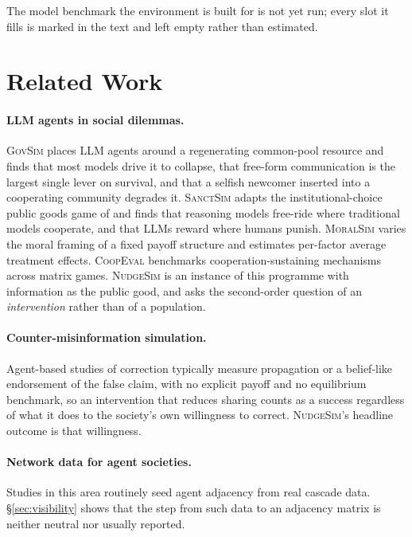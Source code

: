 \documentclass{article}
\begin{document}
The model benchmark the environment is built for is not yet run; every slot it
fills is marked in the text and left empty rather than estimated.

\section{Related Work}

\paragraph{LLM agents in social dilemmas.}
\textsc{GovSim} \citep{piatti2024govsim} places LLM agents around a regenerating
common-pool resource and finds that most models drive it to collapse, that
free-form communication is the largest single lever on survival, and that a
selfish newcomer inserted into a cooperating community degrades it.
\textsc{SanctSim} \citep{piedrahita2025sanctsim} adapts the institutional-choice
public goods game of \citet{guerek2006} and finds that reasoning models
free-ride where traditional models cooperate, and that LLMs reward where humans
punish. \textsc{MoralSim} \citep{backmann2025moralsim} varies the moral framing
of a fixed payoff structure and estimates per-factor average treatment effects.
\textsc{CoopEval} \citep{tewolde2026coopeval} benchmarks cooperation-sustaining
mechanisms across matrix games. \textsc{NudgeSim} is an instance of this
programme with information as the public good, and asks the second-order
question of an \emph{intervention} rather than of a population.

\paragraph{Counter-misinformation simulation.}
Agent-based studies of correction typically measure propagation or a
belief-like endorsement of the false claim, with no explicit payoff and no
equilibrium benchmark, so an intervention that reduces sharing counts as a
success regardless of what it does to the society's own willingness to correct.
\textsc{NudgeSim}'s headline outcome is that willingness.

\paragraph{Network data for agent societies.}
Studies in this area routinely seed agent adjacency from real cascade data.
\S\ref{sec:visibility} shows that the step from such data to an adjacency
matrix is neither neutral nor usually reported.
\end{document}
